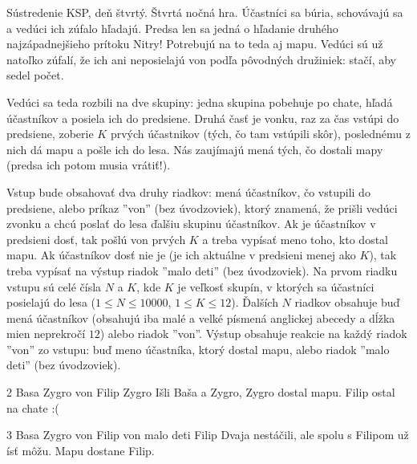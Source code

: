 




Sústredenie KSP, deň štvrtý. Štvrtá nočná hra. Účastníci sa búria, schovávajú 
sa a vedúci ich zúfalo hľadajú. Predsa len sa jedná o hľadanie druhého 
najzápadnejšieho prítoku Nitry! Potrebujú na to teda aj mapu. Vedúci sú už 
natoľko zúfalí, že ich ani neposielajú von podľa pôvodných družiniek: stačí, 
aby sedel počet.

Vedúci sa teda rozbili na dve skupiny: jedna skupina pobehuje po chate, hľadá 
účastníkov a posiela ich do predsiene. Druhá časť je vonku, raz za čas 
vstúpi do predsiene, zoberie $K$ prvých účastnikov (tých, čo tam vstúpili 
skôr), poslednému z nich dá mapu a pošle ich do lesa. Nás zaujímajú mená tých, 
čo dostali mapy (predsa ich potom musia vrátiť!).

Vstup bude obsahovať dva druhy riadkov: mená účastníkov, čo vstupili do 
predsiene, alebo príkaz ''von'' (bez úvodzoviek), ktorý znamená, že prišli 
vedúci zvonku a chcú poslať do lesa ďalšiu skupinu účastníkov. Ak je 
účastníkov v predsieni dosť, tak pošlú von prvých $K$ a treba vypísať meno 
toho, kto dostal mapu. Ak účastníkov dosť nie je (je ich aktuálne v predsieni 
menej ako $K$), tak treba vypísať na výstup riadok ''malo deti'' (bez 
úvodzoviek).
Na prvom riadku vstupu sú celé čísla $N$ a $K$, kde $K$ je veľkosť skupín, v 
ktorých sa účastníci posielajú do lesa ($1 \leq N \leq 10000$, $1 \leq K 
\leq 12$). Ďalších $N$ riadkov obsahuje buď mená účastníkov (obsahujú iba malé 
a velké písmená anglickej abecedy a dĺžka mien neprekročí $12$) alebo riadok 
''von''.
Výstup obsahuje reakcie na každý riadok ''von'' zo vstupu: buď meno účastníka,
ktorý dostal mapu, alebo riadok ''malo deti'' (bez úvodzoviek).

 2
Basa
Zygro
von
Filip
\vystup
Zygro
\komentar
Išli Baša a Zygro, Zygro dostal mapu.
Filip ostal na chate :(
\koniec

 3
Basa
Zygro
von
Filip
von
\vystup
malo deti
Filip
\komentar
Dvaja nestáčili, ale spolu s Filipom už ísť môžu. Mapu dostane Filip.
\koniec


